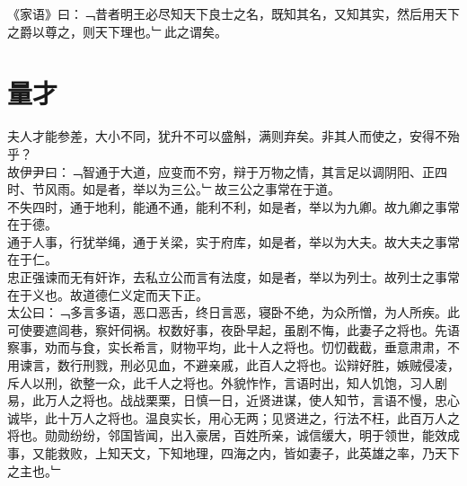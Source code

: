 《家语》曰：﹁昔者明王必尽知天下良士之名，既知其名，又知其实，然后用天下之爵以尊之，则天下理也。﹂此之谓矣。


\chapter{量才}%
夫人才能参差，大小不同，犹升不可以盛斛，满则弃矣。非其人而使之，安得不殆乎？\\
故伊尹曰：﹁智通于大道，应变而不穷，辩于万物之情，其言足以调阴阳、正四时、节风雨。如是者，举以为三公。﹂故三公之事常在于道。
\\
不失四时，通于地利，能通不通，能利不利，如是者，举以为九卿。故九卿之事常在于德。\\
通于人事，行犹举绳，通于关梁，实于府库，如是者，举以为大夫。故大夫之事常在于仁。\\
忠正强谏而无有奸诈，去私立公而言有法度，如是者，举以为列士。故列士之事常在于义也。故道德仁义定而天下正。\\
太公曰：﹁多言多语，恶口恶舌，终日言恶，寝卧不绝，为众所憎，为人所疾。此可使要遮闾巷，察奸伺祸。权数好事，夜卧早起，虽剧不悔，此妻子之将也。先语察事，劝而与食，实长希言，财物平均，此十人之将也。忉忉截截，垂意肃肃，不用谏言，数行刑戮，刑必见血，不避亲戚，此百人之将也。讼辩好胜，嫉贼侵凌，斥人以刑，欲整一众，此千人之将也。外貌怍怍，言语时出，知人饥饱，习人剧易，此万人之将也。战战栗栗，日慎一日，近贤进谋，使人知节，言语不慢，忠心诚毕，此十万人之将也。温良实长，用心无两；见贤进之，行法不枉，此百万人之将也。勋勋纷纷，邻国皆闻，出入豪居，百姓所亲，诚信缓大，明于领世，能效成事，又能救败，上知天文，下知地理，四海之内，皆如妻子，此英雄之率，乃天下之主也。﹂
